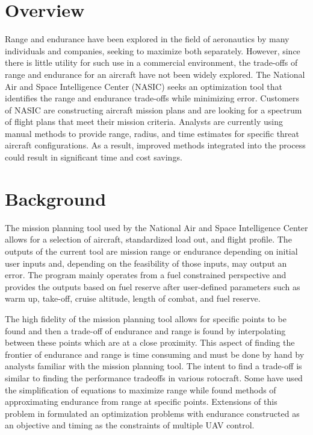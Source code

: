 \section{Overview}
\hspace{.5cm} Range and endurance have been explored in the field of aeronautics by many individuals and companies, seeking to maximize both separately. However, since there is little utility for such use in a commercial environment, the trade-offs of range and endurance for an aircraft have not been widely explored. The National Air and Space Intelligence Center (NASIC) seeks an optimization tool that identifies the range and endurance trade-offs while minimizing error. Customers of NASIC are constructing aircraft mission plans and are looking for a spectrum of flight plans that meet their mission criteria. Analysts are currently using manual methods to provide range, radius, and time estimates for specific threat aircraft configurations. As a result, improved methods integrated into the process could result in significant time and cost savings. 

\section{Background}

\hspace{.5cm}The mission planning tool used by the National Air and Space Intelligence Center allows for a selection of aircraft, standardized load out, and flight profile. The outputs of the current tool are mission range or endurance depending on initial user inputs and, depending on the feasibility of those inputs, may output an error. The program mainly operates from a fuel constrained perspective and provides the outputs based on fuel reserve after user-defined parameters such as warm up, take-off, cruise altitude, length of combat, and fuel reserve. \par
The high fidelity of the mission planning tool allows for specific points to be found and then a trade-off of endurance and range is found by interpolating between these points which are at a close proximity. This aspect of finding the frontier of endurance and range is time consuming and must be done by hand by analysts familiar with the mission planning tool. The intent to find a trade-off is similar to \cite{Tradeoffs} finding the performance tradeoffs in various rotocraft. Some have used the simplification of equations to maximize range \cite{breguetRangeEqn, OptimizeBreguet} while \cite{LoiterTimeFromRange} found methods of approximating endurance from range at specific points. Extensions of this problem in \cite{Alighanbari} formulated an optimization problems with endurance constructed as an objective and timing as the constraints of multiple UAV control. 

